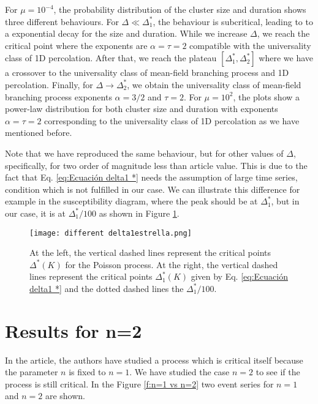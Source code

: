 For $\mu=10^{-4}$, the probability distribution of the cluster size and duration shows three different behaviours. For $\Delta\ll\Delta_1^*$, the behaviour is subcritical, leading to
to a exponential decay for the size and duration. While we increase $\Delta$, we reach the critical point where the exponents are $\alpha=\tau=2$ compatible with the universality class
of 1D percolation. After that, we reach the plateau $[\Delta_1^*,\Delta_2^*]$ where we have a crossover to the universality class of mean-field branching process and 1D percolation. 
Finally, for $\Delta\to\Delta_2^*$, we obtain the universality class of mean-field branching process exponents $\alpha=3/2$ and $\tau=2$. 
For $\mu=10^2$, the plots show a power-law distribution for both cluster size and duration with exponents $\alpha=\tau=2$ corresponding to the universality class of 1D percolation as we have
mentioned before.  

Note that we have reproduced the same behaviour, but for other values of $\Delta$, specifically, for two order of magnitude less than article value. This is due 
to the fact that Eq. \ref{eq:Ecuación delta1 *} needs the assumption of large time series, condition which is not fulfilled in our case. We can illustrate this difference 
for example in the susceptibility diagram, where the peak should be at $\Delta_1^*$, but in our case, it is at $\Delta_1^*/100$ as shown in Figure \ref{f:different delta1estrella}. 

\begin{figure}[H]
\centering
\texttt{[image: different delta1estrella.png]}
\caption{At the left, the vertical dashed lines represent the critical points $\Delta^*(K)$ for the Poisson process. At the right, the vertical dashed lines represent 
the critical points $\Delta_1^*(K)$ given by Eq. \ref{eq:Ecuación delta1 *} and the dotted dashed lines the $\Delta_1^*/100$.} 
\label{f:different delta1estrella}
\end{figure}




\section{Results for n=2}

In the article, the authors have studied a process which is critical itself because the parameter $n$ is fixed to $n=1$. We have studied the case $n=2$ to see if the process is still critical. 
In the Figure \ref{f:n=1 vs n=2} two event series for $n=1$ and $n=2$ are shown. 

